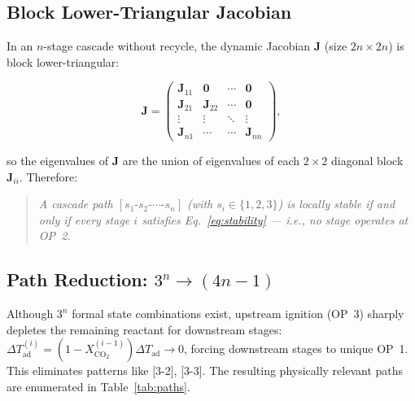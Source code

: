 \documentclass[11pt,a4paper]{article}
\newcommand{\dTad}{\Delta T_{\mathrm{ad}}}
\newcommand{\Xco}{X_{\mathrm{CO_2}}}
\begin{document}
\subsection{Block Lower-Triangular Jacobian}

In an $n$-stage cascade without recycle, the dynamic Jacobian $\mathbf{J}$
(size $2n\times2n$) is block lower-triangular:

\begin{equation}
  \mathbf{J} =
  \begin{pmatrix}
    \mathbf{J}_{11} & \mathbf{0} & \cdots & \mathbf{0} \\
    \mathbf{J}_{21} & \mathbf{J}_{22} & \cdots & \mathbf{0} \\
    \vdots & \vdots & \ddots & \vdots \\
    \mathbf{J}_{n1} & \cdots & \cdots & \mathbf{J}_{nn}
  \end{pmatrix},
\end{equation}

so the eigenvalues of $\mathbf{J}$ are the union of eigenvalues of each
$2\times2$ diagonal block $\mathbf{J}_{ii}$.  Therefore:

\begin{quote}
  \textit{A cascade path $[s_1\text{-}s_2\text{-}\cdots\text{-}s_n]$
  (with $s_i\in\{1,2,3\}$) is locally stable if and only if
  every stage $i$ satisfies Eq.~\eqref{eq:stability} — i.e., no stage
  operates at OP~2.}
\end{quote}

\subsection{Path Reduction: $3^n \to (4n-1)$}

Although $3^n$ formal state combinations exist, upstream ignition (OP~3)
sharply depletes the remaining reactant for downstream stages:
$\dTad^{(i)} = (1-\Xco^{(i-1)})\dTad \to 0$, forcing downstream stages
to unique OP~1.  This eliminates patterns like [3-2], [3-3].
The resulting physically relevant paths are enumerated in
Table~\ref{tab:paths}.
\end{document}
